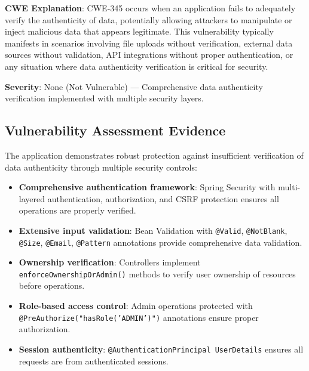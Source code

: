 \documentclass[]{UCD_CS_FYP_Report}
\begin{document}
\textbf{CWE Explanation}: CWE-345 occurs when an application fails to adequately verify the authenticity of data, potentially allowing attackers to manipulate or inject malicious data that appears legitimate. This vulnerability typically manifests in scenarios involving file uploads without verification, external data sources without validation, API integrations without proper authentication, or any situation where data authenticity verification is critical for security.

\textbf{Severity}: None (Not Vulnerable) — Comprehensive data authenticity verification implemented with multiple security layers.

\subsection{Vulnerability Assessment Evidence}
The application demonstrates robust protection against insufficient verification of data authenticity through multiple security controls:
\begin{itemize}
	\item \textbf{Comprehensive authentication framework}: Spring Security with multi-layered authentication, authorization, and CSRF protection ensures all operations are properly verified.
	\item \textbf{Extensive input validation}: Bean Validation with \texttt{@Valid}, \texttt{@NotBlank}, \texttt{@Size}, \texttt{@Email}, \texttt{@Pattern} annotations provide comprehensive data validation.
	\item \textbf{Ownership verification}: Controllers implement \texttt{enforceOwnershipOrAdmin()} methods to verify user ownership of resources before operations.
	\item \textbf{Role-based access control}: Admin operations protected with \texttt{@PreAuthorize("hasRole('ADMIN')")} annotations ensure proper authorization.
	\item \textbf{Session authenticity}: \texttt{@AuthenticationPrincipal UserDetails} ensures all requests are from authenticated sessions.
\end{itemize}
\end{document}
